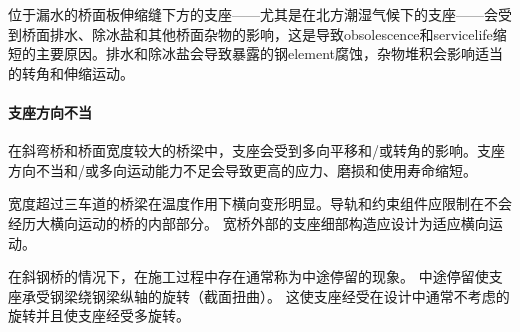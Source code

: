 位于漏水的桥面板伸缩缝下方的支座——尤其是在北方潮湿气候下的支座——会受到桥面排水、除冰盐和其他桥面杂物的影响，这是导致\gls*{obsolescence}和\gls*{servicelife}缩短的主要原因。排水和除冰盐会导致暴露的钢\gls*{element}腐蚀，杂物堆积会影响适当的转角和伸缩运动。

\paragraph{支座方向不当}

在斜弯桥和桥面宽度较大的桥梁中，支座会受到多向平移和/或转角的影响。支座方向不当和/或多向运动能力不足会导致更高的应力、磨损和使用寿命缩短。

宽度超过三车道的桥梁在温度作用下横向变形明显。导轨和约束组件应限制在不会经历大横向运动的桥的内部部分。 宽桥外部的支座细部构造应设计为适应横向运动。

在斜钢桥的情况下，在施工过程中存在通常称为中途停留的现象。 中途停留使支座承受钢梁绕钢梁纵轴的旋转（截面扭曲）。 这使支座经受在设计中通常不考虑的旋转并且使支座经受多旋转。


